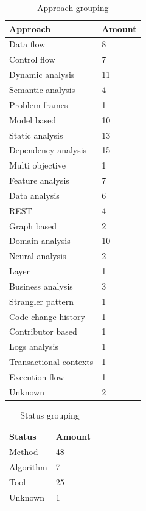 \documentclass[conference]{IEEEtran}
\begin{document}
\begin{table}[!htb] \caption{Approach grouping} \label{tab:approach-grouping}
  \begin{center}
    \begin{tabular}[c]{p{12em}|p{4em}}
      \textbf{Approach} &
      \textbf{Amount} \\
      \hline Data flow & {8} \\
      \hline Control flow & {7} \\
      \hline Dynamic analysis & {11} \\
      \hline Semantic analysis & {4} \\
      \hline Problem frames & {1} \\
      \hline Model based & {10} \\
      \hline Static analysis & {13} \\
      \hline Dependency analysis & {15} \\
      \hline Multi objective & {1} \\
      \hline Feature analysis & {7} \\
      \hline Data analysis & {6} \\
      \hline REST & {4} \\
      \hline Graph based & {2} \\
      \hline Domain analysis & {10} \\
      \hline Neural analysis & {2} \\
      \hline Layer & {1} \\
      \hline Business analysis & {3} \\
      \hline Strangler pattern & {1} \\
      \hline Code change history & {1} \\
      \hline Contributor based & {1} \\
      \hline Logs analysis & {1} \\
      \hline Transactional contexts & {1} \\
      \hline Execution flow & {1} \\
      \hline Unknown & {2} \\
    \end{tabular}
  \end{center}
\end{table}

\begin{table}[!htb] \caption{Status grouping} \label{tab:status-grouping}
  \begin{center}
    \begin{tabular}[c]{p{12em}|p{4em}}
      \textbf{Status} &
      \textbf{Amount} \\
      \hline Method & {48} \\
      \hline Algorithm & {7} \\
      \hline Tool & {25} \\
      \hline Unknown & {1} \\
    \end{tabular}
  \end{center}
\end{table}
\end{document}
